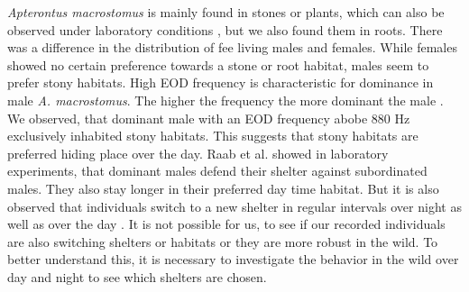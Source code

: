 \textit{Apterontus macrostomus} is mainly found in stones or plants, which can also be observed under laboratory conditions \citep{raab2019,}, but we also found them in roots. There was a difference in the distribution of fee living males and females. While females showed no certain preference towards a stone or root habitat, males seem to prefer stony habitats. High EOD frequency is characteristic for dominance in male \textit{A. macrostomus}. The higher the frequency the more dominant the male \citep{raab2019}. We observed, that dominant male with an EOD frequency abobe 880 Hz exclusively inhabited stony habitats. This suggests that stony habitats are preferred hiding place over the day. Raab et al. showed in laboratory experiments, that dominant males defend their shelter against subordinated males. They also stay longer in their preferred day time habitat. But it is also observed that individuals switch to a new shelter in regular intervals over night as well as over the day \citep{raab2019}. It is not possible for us, to see if our recorded individuals are also switching shelters or habitats or they are more robust in the wild.  To better understand this, it is necessary to investigate the behavior in the wild over day and night to see which shelters are chosen.

%


%
%
%
